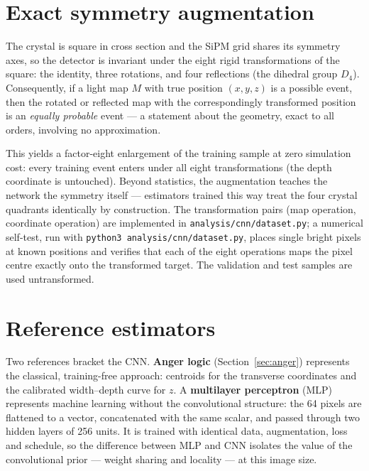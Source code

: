 \documentclass[11pt,a4paper]{article}
\newcommand{\code}[1]{\texttt{#1}}
\begin{document}
\section{Exact symmetry augmentation}
\label{sec:d4}

The crystal is square in cross section and the SiPM grid shares its symmetry
axes, so the detector is invariant under the eight rigid transformations of
the square: the identity, three rotations, and four reflections (the dihedral
group $D_4$). Consequently, if a light map $M$ with true position $(x, y, z)$
is a possible event, then the rotated or reflected map with the correspondingly
transformed position is an \emph{equally probable} event --- a statement about
the geometry, exact to all orders, involving no approximation.

This yields a factor-eight enlargement of the training sample at zero
simulation cost: every training event enters under all eight transformations
(the depth coordinate is untouched). Beyond statistics, the augmentation
teaches the network the symmetry itself --- estimators trained this way treat
the four crystal quadrants identically by construction. The transformation
pairs (map operation, coordinate operation) are implemented in
\code{analysis/cnn/dataset.py}; a numerical self-test, run with
\code{python3 analysis/cnn/dataset.py}, places single bright pixels at known
positions and verifies that each of the eight operations maps the pixel centre
exactly onto the transformed target. The validation and test samples are used
untransformed.

\section{Reference estimators}
\label{sec:baselines}

Two references bracket the CNN. \textbf{Anger logic}
(Section~\ref{sec:anger}) represents the classical, training-free approach:
centroids for the transverse coordinates and the calibrated width--depth curve
for $z$. A \textbf{multilayer perceptron} (MLP) represents machine learning
without the convolutional structure: the 64 pixels are flattened to a vector,
concatenated with the same scalar, and passed through two hidden layers of 256
units. It is trained with identical data, augmentation, loss and schedule, so
the difference between MLP and CNN isolates the value of the convolutional
prior --- weight sharing and locality --- at this image size.
\end{document}
